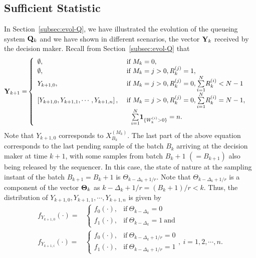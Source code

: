 \documentclass[acmtosn]{acmtrans2m}
\begin{document}
\subsection{Sufficient Statistic} 
\label{subsec:sufficient-statistic} 
In Section~\ref{subsec:evol-Q}, we have illustrated the evolution of the queueing 
system ${\bf Q}_k$ and we have shown in different scenarios, the vector ${\bf Y}_k$ 
received by the decision maker. Recall from Section~\ref{subsec:evol-Q} that
\begin{align*}
{\bf Y}_{k+1} = & \left\{
\begin{array}{ll}
 \emptyset, & \ \text{if} \ M_k = 0,\\
 \emptyset, & \ \text{if} \ M_k = j > 0, R_k^{(j)} = 1,\\ 
 Y_{k+1,0}, & \ \text{if} \ M_k = j > 0, R_k^{(j)} = 0, {\mysum i 1 N} R_k^{(i)} < N-1\\ 
 \left[Y_{k+1,0},Y_{k+1,1},\cdots,Y_{k+1,n}\right], & \ \text{if} \ M_k = j > 0, R_k^{(j)} = 0,
{\mysum i 1 N} R_k^{(i)} = N-1,\\
& \ \ \ {\mysum i 1 N} {\bf 1}_{\{W_k^{(i)} > 0\}} = n. 
\end{array}
\right.
\end{align*}
Note that $Y_{k+1,0}$ corresponds to $X_{B_k}^{(M_k)}$. The last part of
the above equation corresponds to the last pending sample of the batch
$B_k$ arriving at the decision maker at time $k+1$, with some samples
from batch $B_k+1$ $(=B_{k+1})$ also being released by the sequencer.
In this case, the state of nature at the sampling instant of the batch 
$B_{k+1}=B_k+1$ is $\Theta_{k-\Delta_k+1/r}$. Note that 
$\Theta_{k-\Delta_k+1/r}$ is a component of the vector ${\bf \Theta}_k$
as $k-\Delta_k+1/r = (B_k+1)/r < k$.
Thus, the distribution of 
$Y_{k+1,0},Y_{k+1,1},\cdots,Y_{k+1,n}$ is given by
\begin{align*}
f_{Y_{k+1,0}}(\cdot) = & \left\{
\begin{array}{ll}
f_0(\cdot), & \text{if} \  \Theta_{k-\Delta_k} = 0 \\
f_1(\cdot), & \text{if} \  \Theta_{k-\Delta_k} = 1 \ \text{and}
\end{array}
\right. \\
f_{Y_{k+1,i}}(\cdot) = & \left\{
\begin{array}{ll}
f_0(\cdot), & \text{if} \  \Theta_{k-\Delta_k+1/r}  = 0 \\
f_1(\cdot), & \text{if} \  \Theta_{k-\Delta_k+1/r}  = 1
\end{array}
\right., \ i=1,2,\cdots,n. 
\end{align*}
\end{document}
